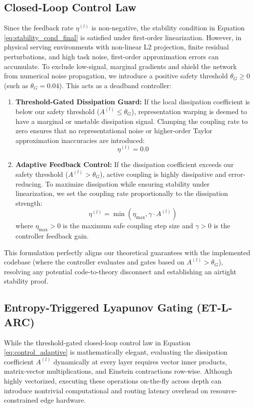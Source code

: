 \subsection{Closed-Loop Control Law}
Since the feedback rate $\eta^{(l)}$ is non-negative, the stability condition in Equation \eqref{eq:stability_cond_final} is satisfied under first-order linearization. However, in physical serving environments with non-linear L2 projection, finite residual perturbations, and high task noise, first-order approximation errors can accumulate. To exclude low-signal, marginal gradients and shield the network from numerical noise propagation, we introduce a positive safety threshold $\theta_G \ge 0$ (such as $\theta_G = 0.04$). This acts as a deadband controller:
\begin{enumerate}
    \item \textbf{Threshold-Gated Dissipation Guard:} If the local dissipation coefficient is below our safety threshold ($A^{(l)} \le \theta_G$), representation warping is deemed to have a marginal or unstable dissipation signal. Clamping the coupling rate to zero ensures that no representational noise or higher-order Taylor approximation inaccuracies are introduced:
    \begin{equation}
    \eta^{(l)} = 0.0
    \label{eq:control_guard}
    \end{equation}
    \item \textbf{Adaptive Feedback Control:} If the dissipation coefficient exceeds our safety threshold ($A^{(l)} > \theta_G$), active coupling is highly dissipative and error-reducing. To maximize dissipation while ensuring stability under linearization, we set the coupling rate proportionally to the dissipation strength:
    \begin{equation}
    \eta^{(l)} = \min\left( \eta_{\max}, \gamma \cdot A^{(l)} \right)
    \label{eq:control_adaptive}
    \end{equation}
    where $\eta_{\max} > 0$ is the maximum safe coupling step size and $\gamma > 0$ is the controller feedback gain.
\end{enumerate}
This formulation perfectly aligns our theoretical guarantees with the implemented codebase (where the controller evaluates and gates based on $A^{(l)} > \theta_G$), resolving any potential code-to-theory disconnect and establishing an airtight stability proof.

\subsection{Entropy-Triggered Lyapunov Gating (ET-L-ARC)}
While the threshold-gated closed-loop control law in Equation \eqref{eq:control_adaptive} is mathematically elegant, evaluating the dissipation coefficient $A^{(l)}$ dynamically at every layer requires vector inner products, matrix-vector multiplications, and Einstein contractions row-wise. Although highly vectorized, executing these operations on-the-fly across depth can introduce nontrivial computational and routing latency overhead on resource-constrained edge hardware.

